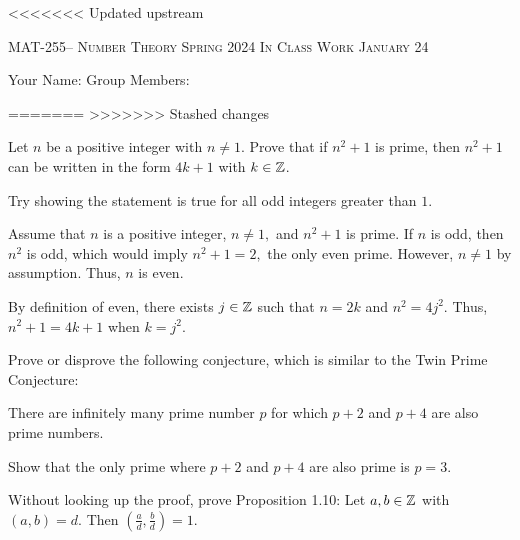 \documentclass[handout]{ximera}
\date{January 24, 2024}
\date{\classday, 2024}
\begin{document}
\handoutAbstract
\maketitle
<<<<<<< Updated upstream
    \begin{center}%
        {\large \scshape MAT-255-- Number Theory \hfill Spring 2024 \hfill In Class Work January 24}%
    
        {\large
            Your Name: \hrulefill \quad Group Members:\hrulefill \quad \hrulefill
	    \par}%
    \end{center}%
=======
>>>>>>> Stashed changes


  
\begin{br}
    Let $n$ be a positive integer with $n\neq 1$. Prove that if $n^2+1$ is prime, then $n^2+1$ can be written in the form $4k+1$ with $k\in\mathbb Z$.


    \begin{hint}
        Try showing the statement is true for all odd integers greater than $1.$
    \end{hint}

    \begin{solution}
        Assume that $n$ is a positive integer, $n\neq 1,$ and $n^2+1$ is prime. If $n$ is odd, then $n^2$ is odd, which would imply $n^2+1=2,$ the only even prime. However, $n\neq 1$ by assumption. Thus, $n$ is even. 

        By definition of even, there exists $j\in\mathbb Z$ such that $n=2k$ and $n^2=4j^2$. Thus, $n^2+1=4k+1$ when $k=j^2.$
    \end{solution}
\end{br}

\pdfOnly{\ifhandout{
    \vfill
    \vfill}
    \else
    \fi}

\begin{br}
    Prove or disprove the following conjecture, which is similar to the Twin Prime Conjecture:
    \begin{conjecture}
        There are infinitely many prime number $p$ for which $p+2$ and $p+4$ are also prime numbers.
    \end{conjecture}


    \begin{hint}
        Show that the only prime where $p+2$ and $p+4$ are also prime is $p=3.$ 
    \end{hint}


    \pdfOnly{\ifhandout{
        \vfill}
        \else
        \fi}
\end{br}

 
\begin{br}
    Without looking up the proof, prove 
    Proposition 1.10:
    Let $a, b\in \mathbb Z$ with $(a,b)=d.$ Then $\left(\frac{a}{d},\frac{b}{d}\right)=1.$
\end{br}
\end{document}
